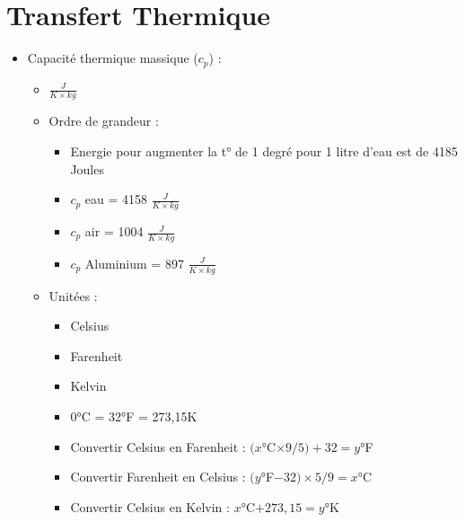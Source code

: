 \documentclass[a4paper]{article}
\begin{document}
\section{Transfert Thermique}
\begin{itemize}
    \item Capacité thermique massique ($c_p$) :
        \begin{itemize}
            \item $\frac{J}{K \times kg}$
            \item Ordre de grandeur :
                \begin{itemize}
                    \item Energie pour augmenter la t° de 1 degré pour 1 litre d'eau est de 4185 Joules
                    \item $c_p$ eau = 4158 $\frac{J}{K \times kg}$
                    \item $c_p$ air = 1004 $\frac{J}{K \times kg}$
                    \item $c_p$ Aluminium = 897 $\frac{J}{K \times kg}$
                \end{itemize}
            \item Unitées :
                \begin{itemize}
                    \item Celsius
                    \item Farenheit
                    \item Kelvin
                    \item 0°C = 32°F = 273,15K
                    \item Convertir Celsius en Farenheit : $(x$°C$ \times 9/5) + 32 = y$°F
                    \item Convertir Farenheit en Celsius : $(y$°F$ − 32) \times 5/9 = x$°C
                    \item Convertir Celsius en Kelvin : $x$°C$ + 273,15 = y$°K
                \end{itemize}
        \end{itemize}
        \vspace{0.5cm}


\end{itemize}
\end{document}
